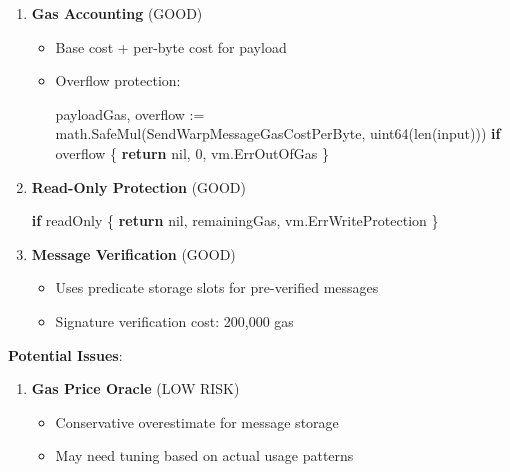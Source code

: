 \documentclass[
]{article}
\newenvironment{Shaded}{}{}
\newcommand{\BuiltInTok}[1]{\textcolor[rgb]{0.00,0.50,0.00}{#1}}
\newcommand{\ControlFlowTok}[1]{\textcolor[rgb]{0.00,0.44,0.13}{\textbf{#1}}}
\newcommand{\DataTypeTok}[1]{\textcolor[rgb]{0.56,0.13,0.00}{#1}}
\newcommand{\DecValTok}[1]{\textcolor[rgb]{0.25,0.63,0.44}{#1}}
\newcommand{\NormalTok}[1]{#1}
\newcommand{\OperatorTok}[1]{\textcolor[rgb]{0.40,0.40,0.40}{#1}}
\newcommand{\OtherTok}[1]{\textcolor[rgb]{0.00,0.44,0.13}{#1}}
\providecommand{\tightlist}{%
  \setlength{\itemsep}{0pt}\setlength{\parskip}{0pt}}
\begin{document}
\begin{enumerate}
\def\labelenumi{\arabic{enumi}.}
\item
  \textbf{Gas Accounting} (GOOD)

  \begin{itemize}
  \tightlist
  \item
    Base cost + per-byte cost for payload
  \item
    Overflow protection:

\begin{Shaded}
\begin{Highlighting}[]
\NormalTok{payloadGas}\OperatorTok{,}\NormalTok{ overflow }\OperatorTok{:=}\NormalTok{ math}\OperatorTok{.}\NormalTok{SafeMul}\OperatorTok{(}\NormalTok{SendWarpMessageGasCostPerByte}\OperatorTok{,} \DataTypeTok{uint64}\OperatorTok{(}\BuiltInTok{len}\OperatorTok{(}\NormalTok{input}\OperatorTok{)))}
\ControlFlowTok{if}\NormalTok{ overflow }\OperatorTok{\{}
    \ControlFlowTok{return} \OtherTok{nil}\OperatorTok{,} \DecValTok{0}\OperatorTok{,}\NormalTok{ vm}\OperatorTok{.}\NormalTok{ErrOutOfGas}
\OperatorTok{\}}
\end{Highlighting}
\end{Shaded}
  \end{itemize}
\item
  \textbf{Read-Only Protection} (GOOD)

\begin{Shaded}
\begin{Highlighting}[]
\ControlFlowTok{if}\NormalTok{ readOnly }\OperatorTok{\{}
    \ControlFlowTok{return} \OtherTok{nil}\OperatorTok{,}\NormalTok{ remainingGas}\OperatorTok{,}\NormalTok{ vm}\OperatorTok{.}\NormalTok{ErrWriteProtection}
\OperatorTok{\}}
\end{Highlighting}
\end{Shaded}
\item
  \textbf{Message Verification} (GOOD)

  \begin{itemize}
  \tightlist
  \item
    Uses predicate storage slots for pre-verified messages
  \item
    Signature verification cost: 200,000 gas
  \end{itemize}
\end{enumerate}

\textbf{Potential Issues}:

\begin{enumerate}
\def\labelenumi{\arabic{enumi}.}
\tightlist
\item
  \textbf{Gas Price Oracle} (LOW RISK)

  \begin{itemize}
  \tightlist
  \item
    Conservative overestimate for message storage
  \item
    May need tuning based on actual usage patterns
  \end{itemize}
\end{enumerate}
\end{document}
